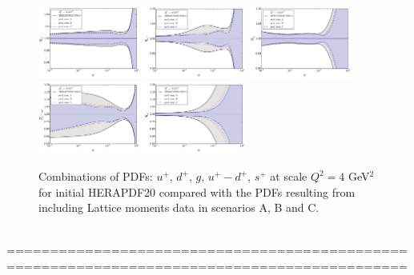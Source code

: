 \begin{figure}[!t]
\centering
\includegraphics[width=0.3\textwidth]{plots/ratio_uPubar_Q2.pdf}
\includegraphics[width=0.3\textwidth]{plots/ratio_dPdbar_Q2.pdf}
\includegraphics[width=0.3\textwidth]{plots/ratio_g_Q2.pdf}
\\
\includegraphics[width=0.3\textwidth]{plots/ratio_uPubarMdMdbar_Q2.pdf}
\includegraphics[width=0.3\textwidth]{plots/ratio_sPsbar_Q2.pdf}
\caption{\small Combinations of PDFs: $u^+$, $d^+$, $g$, $u^+-d^+$, $s^+$ at scale $Q^2=4$ GeV$^2$
for initial HERAPDF20 compared with the PDFs resulting from including Lattice moments
data in scenarios A, B and C.
}
\label{fig:pdfsProf}
\end{figure}
%
%
\vspace{1cm}
\\
==============================================\\
==============================================\\
